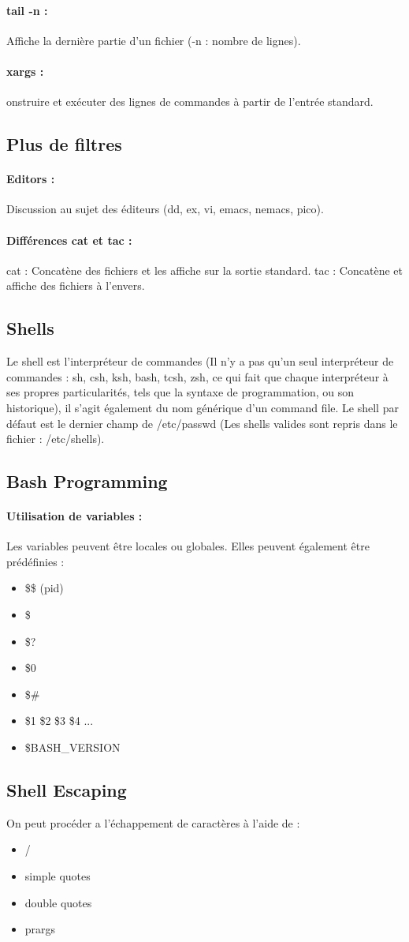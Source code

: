 \documentclass{article}[12pt]
\begin{document}
\paragraph{tail -n : } Affiche la dernière partie d'un fichier (-n : nombre de lignes).
\paragraph{xargs : } onstruire et exécuter des lignes de commandes à partir de l'entrée standard.
\subsection{ Plus de filtres}
\paragraph{Editors : } Discussion au sujet des éditeurs (dd, ex, vi, emacs, nemacs, pico). 
\paragraph{Différences cat et tac : } cat : Concatène des fichiers et les affiche sur la sortie standard. tac : Concatène et affiche des fichiers à l'envers.
\subsection{ Shells}
Le shell est l'interpréteur de commandes (Il n'y a pas qu'un seul interpréteur de commandes : sh, csh, ksh, bash, tcsh, zsh, ce qui fait que chaque interpréteur à ses propres particularités, tels que la syntaxe de programmation, ou son historique), il s'agit également du nom générique d'un command file. Le shell par défaut est le dernier champ de /etc/passwd (Les shells valides sont repris dans le fichier : /etc/shells).
\subsection{ Bash Programming}
\paragraph{Utilisation de variables : } Les variables peuvent être locales ou globales. Elles peuvent également être prédéfinies : 
\begin{itemize}
\item \$\$ (pid)
\item \$\*
\item \$?
\item \$0
\item \$\#
\item \$1 \$2 \$3 \$4 ...
\item \$BASH\_VERSION
\end{itemize}
\subsection{ Shell Escaping}
On peut procéder a l’échappement de caractères à l'aide de : 
\begin{itemize}
\item /
\item simple quotes
\item double quotes
\item prargs
\end{itemize}
\end{document}
